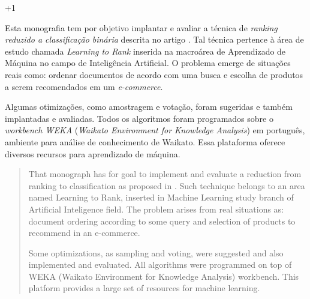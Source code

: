 \documentclass[12pt, a4paper, normaltoc, capchap, capsec, times]{abnt}
\begin{document}
\looseness+1


\capa
\folhaderosto

\begin{resumo}
Esta monografia tem por objetivo implantar e avaliar a técnica de \emph{ranking reduzido a classificação binária} descrita no artigo \cite{langford08}. Tal técnica pertence à área de estudo chamada \emph{Learning to Rank} inserida na macroárea de Aprendizado de Máquina no campo de Inteligência Artificial. O problema emerge de situações reais como: ordenar documentos de acordo com uma busca e escolha de produtos a serem recomendados em um \emph{e-commerce}.

Algumas otimizações, como amostragem e votação, foram sugeridas e também implantadas e avaliadas. Todos os algoritmos foram programados sobre o \emph{workbench WEKA} (\emph{Waikato Environment for Knowledge Analysis}) em português, ambiente para análise de conhecimento de Waikato. Essa plataforma oferece diversos recursos para aprendizado de máquina.

\end{resumo}

\begin{abstract}
That monograph has for goal to implement and evaluate a reduction from ranking to classification as proposed in \cite{langford08}. Such technique belongs to an area named Learning to Rank, inserted in Machine Learning study branch of Artificial Inteligence field. The problem arises from real situations as: document ordering according to some query and selection of products to recommend in an e-commerce.

Some optimizations, as sampling and voting, were suggested and also implemented and evaluated. All algorithms were programmed on top of WEKA (Waikato Environment for Knowledge Analysis) workbench. This platform provides a large set of resources for machine learning.

\end{abstract}

\sumario

\ProximoForaDoSumario
\listadefiguras

\ProximoForaDoSumario
\listadetabelas
\end{document}
